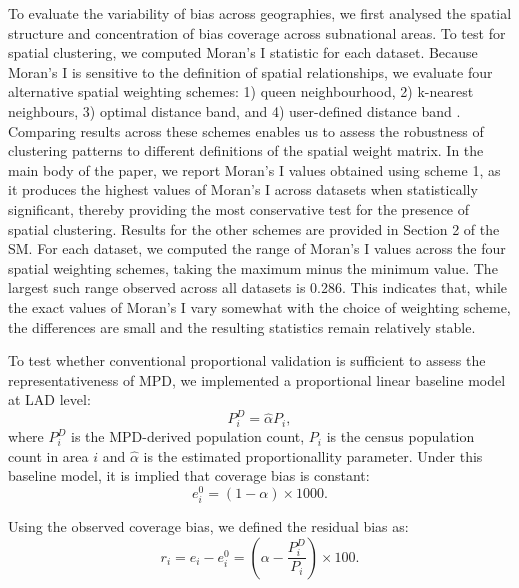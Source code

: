 \documentclass[]{rsos}%
\begin{document}
To evaluate the variability of bias across geographies, we first
analysed the spatial structure and concentration of bias coverage across
subnational areas. To test for spatial clustering, we computed Moran's I
statistic for each dataset. Because Moran's I is sensitive to the
definition of spatial relationships, we evaluate four alternative
spatial weighting schemes: 1) queen neighbourhood, 2) k-nearest
neighbours, 3) optimal distance band, and 4) user-defined distance band
\citep{rey2023}. Comparing results across these schemes enables us to assess
the robustness of clustering patterns to different definitions of the
spatial weight matrix. In the main body of the paper, we report Moran's
I values obtained using scheme 1, as it produces the highest values of
Moran's I across datasets when statistically significant, thereby
providing the most conservative test for the presence of spatial
clustering. Results for the other schemes are provided in Section 2 of
the SM. For each dataset, we computed the range of Moran's I values
across the four spatial weighting schemes, taking the maximum minus the
minimum value. The largest such range observed across all datasets is
0.286. This indicates that, while the exact values of Moran's I vary
somewhat with the choice of weighting scheme, the differences are small
and the resulting statistics remain relatively stable.

To test whether conventional proportional validation is sufficient to
assess the representativeness of MPD, we implemented a proportional
linear baseline model at LAD level: \begin{equation}
P_i^D = \hat{\alpha} P_i,
\end{equation} where \(P_i^D\) is the MPD-derived population count, \(P_i\)
is the census population count in area \(i\) and \(\hat{\alpha}\) is the
estimated proportionallity parameter. Under this baseline model, it is
implied that coverage bias is constant: \begin{equation}
e^0_i = (1-\alpha)\times 1000.
\end{equation}

Using the observed coverage bias, we defined the residual bias as:
\begin{equation}\label{eq:residual}
r_i = e_i - e_i^0 = (\alpha - \dfrac{P_i^D}{P_i})\times 100.
\end{equation}
\end{document}
